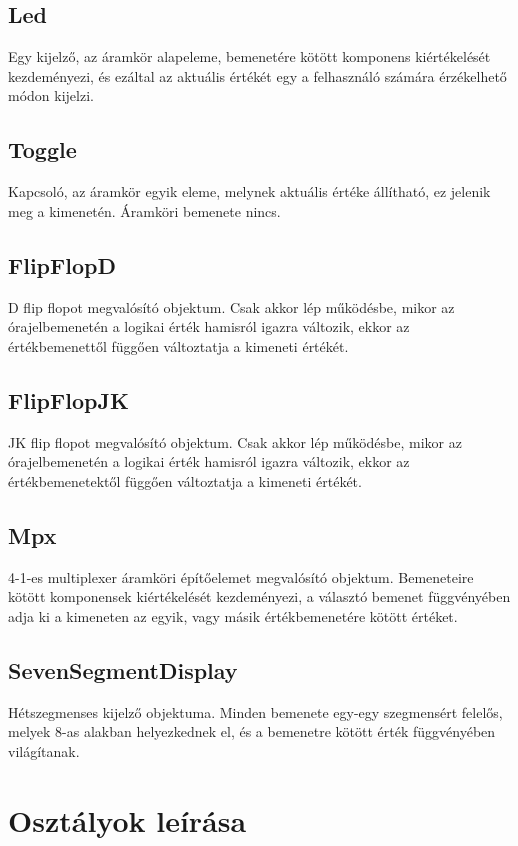 \subsection{\bf Led}
Egy kijelző, az áramkör alapeleme, bemenetére kötött komponens kiértékelését kezdeményezi, és ezáltal az aktuális értékét egy a felhasználó számára érzékelhető módon kijelzi.

\subsection{\bf Toggle}
Kapcsoló, az áramkör egyik eleme, melynek aktuális értéke állítható, ez jelenik meg a kimenetén. Áramköri bemenete nincs.

\subsection{\bf FlipFlopD}
D flip flopot megvalósító objektum. Csak akkor lép működésbe, mikor az órajelbemenetén a logikai érték hamisról igazra változik, ekkor az értékbemenettől függően változtatja a kimeneti értékét.

\subsection{\bf FlipFlopJK}
JK flip flopot megvalósító objektum. Csak akkor lép működésbe, mikor az órajelbemenetén a logikai érték hamisról igazra változik, ekkor az értékbemenetektől függően változtatja a kimeneti értékét.

\subsection{\bf Mpx}
4-1-es multiplexer áramköri építőelemet megvalósító objektum. Bemeneteire kötött komponensek kiértékelését kezdeményezi, a választó bemenet függvényében adja ki a kimeneten az egyik, vagy másik értékbemenetére kötött értéket.

\subsection{\bf SevenSegmentDisplay}
Hétszegmenses kijelző objektuma. Minden bemenete egy-egy szegmensért felelős, melyek 8-as alakban helyezkednek el, és a bemenetre kötött érték függvényében világítanak.

\section{Osztályok leírása}

